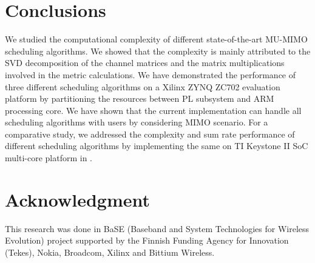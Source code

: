 \documentclass[conference,letterpaper,10pt]{./../../IEEE/IEEEtran}
\begin{document}
\section{Conclusions}
\label{sec:conclusion}
We studied the computational complexity of different state-of-the-art MU-MIMO scheduling algorithms. We showed that the complexity is mainly attributed to the SVD decomposition of the channel matrices and the matrix multiplications involved in the metric calculations. We have demonstrated the performance of three different scheduling algorithms on a Xilinx ZYNQ ZC702 evaluation platform by partitioning the resources between PL subsystem and ARM processing core. We have shown that the current implementation can handle all scheduling algorithms with  users by considering  MIMO scenario. For a comparative study, we addressed the complexity and sum rate performance of different scheduling algorithms by implementing the same on TI Keystone II \ac{SoC} multi-core platform in \cite{gsip}. 

\section*{Acknowledgment}
This research was done in BaSE (Baseband and System Technologies for Wireless Evolution) project supported by the Finnish Funding Agency for Innovation (Tekes), Nokia, Broadcom, Xilinx and Bittium Wireless.



%
\end{document}
